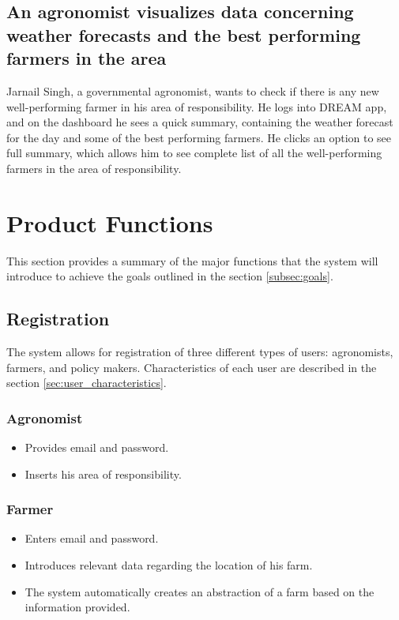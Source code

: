 \subsection*{An agronomist visualizes data concerning weather forecasts and the best performing farmers in the area}
Jarnail Singh, a governmental agronomist, wants to check if there is any new well-performing farmer in his area of responsibility. He logs into DREAM app, and on the dashboard he sees a quick summary, containing the weather forecast for the day and some of the best performing farmers. He clicks an option to see full summary, which allows him to see complete list of all the well-performing farmers in the area of responsibility. 


\section{Product Functions}

This section provides a summary of the major functions that the system will introduce to achieve the goals outlined in the section \ref{subsec:goals}.

\subsection{Registration}
The system allows for registration of three different types of users: agronomists, farmers, and policy makers. Characteristics of each user are described in the section \ref{sec:user_characteristics}.

\subsubsection*{Agronomist}

\begin{itemize}
    \item Provides email and password.
    \item Inserts his area of responsibility.
\end{itemize}

\subsubsection*{Farmer}

\begin{itemize}
    \item Enters email and password.
    \item Introduces relevant data regarding the location of his farm.
    \item The system automatically creates an abstraction of a farm based on the information provided. 
\end{itemize}

